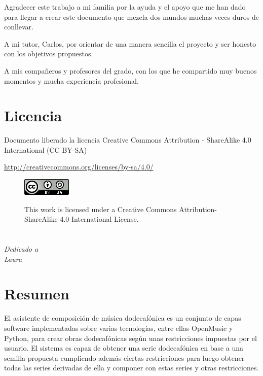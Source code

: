 \documentclass[a4paper,openany,12pt]{memoir}
\begin{document}
Agradecer este trabajo a mi familia por la ayuda y el apoyo que me han dado para llegar a crear este documento que mezcla dos mundos muchas veces duros de conllevar.

A mi tutor, Carlos, por orientar de una manera sencilla el proyecto y ser honesto con los objetivos propuestos.

A mis compañeros y profesores del grado, con los que he compartido muy buenos momentos y mucha experiencia profesional.

\chapter*{Licencia}
Documento liberado la licencia Creative Commons Attribution - ShareAlike 4.0 International (CC BY-SA)

\url{http://creativecommons.org/licenses/by-sa/4.0/}


\begin{figure}
\centering
\includegraphics{img/cc.png} 

This work is licensed under a Creative Commons Attribution-ShareAlike 4.0 International License.
\end{figure}

\chapter*{}
\begin{flushright}
\textit{Dedicado a \\
Laura}
\end{flushright}


\chapter*{Resumen} %

El asistente de composición de música dodecafónica es un conjunto de capas software implementadas sobre varias tecnologías, entre ellas OpenMusic y Python, para crear obras dodecafónicas según unas restricciones impuestas por el usuario. El sistema es capaz de obtener una serie dodecafónica en base a una semilla propuesta cumpliendo además ciertas restricciones para luego obtener todas las series derivadas de ella y componer con estas series y otras restricciones.
\end{document}
